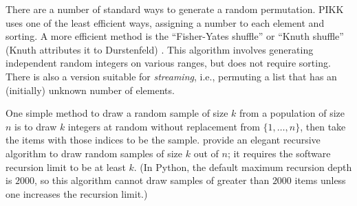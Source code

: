 \documentclass[graybox]{svmult}
\newcommand*\Let[2]{\State #1 $\gets$ #2}
\begin{document}
%

There are a number of standard ways to generate a random permutation.
PIKK uses one of the least efficient ways, assigning a number to each element and sorting.
A more efficient method is the ``Fisher-Yates shuffle'' or ``Knuth shuffle'' (Knuth attributes it to Durstenfeld) \cite{knuth_art_1997}.
This algorithm involves generating independent random integers on various ranges, but does not require sorting.
There is also a version suitable for \emph{streaming}, i.e., permuting a list that has an (initially) unknown number of elements.

One simple method to draw a random sample of size $k$ from a population of size $n$
is to draw $k$ integers at random without replacement from  $\{1, \ldots, n\}$, then take the items with those indices to be the sample.
\cite{cormen_introduction_2009} provide an elegant recursive algorithm to draw random samples of size $k$ out of $n$; it requires the software recursion limit to be at least $k$.
(In Python, the default maximum recursion depth is $2000$, so this algorithm cannot draw samples of greater than $2000$ items unless one increases the recursion limit.)
%
%
%
%
%
\end{document}
